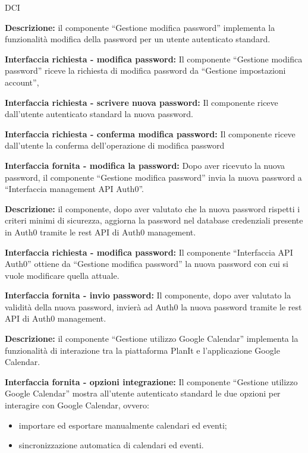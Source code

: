 \begin{listaPersonale}{DCI}

    \textbf{Descrizione:} il componente “Gestione modifica password” implementa la funzionalità modifica della password per un utente autenticato standard.

    \textbf{Interfaccia richiesta - modifica password:} Il componente “Gestione modifica password” riceve la richiesta di modifica password da “Gestione impostazioni account”,

    \textbf{Interfaccia richiesta - scrivere nuova password:} Il componente riceve dall'utente autenticato standard la nuova password.

    \textbf{Interfaccia richiesta - conferma modifica password:} Il componente riceve dall'utente la conferma dell'operazione di modifica password

    \textbf{Interfaccia fornita - modifica la password:} Dopo aver ricevuto la nuova password, il componente “Gestione modifica password” invia la nuova password a “Interfaccia management API Auth0”.



    \textbf{Descrizione:} il componente, dopo aver valutato che la nuova password rispetti i criteri minimi di sicurezza, aggiorna la password nel database credenziali presente in Auth0 tramite le rest API di Auth0 management.

    \textbf{Interfaccia richiesta - modifica password:} Il componente “Interfaccia API Auth0” ottiene da “Gestione modifica password” la nuova password con cui si vuole modificare quella attuale.

    \textbf{Interfaccia fornita - invio password:} Il componente, dopo aver valutato la validità della nuova password, invierà ad Auth0 la nuova password tramite le rest API di Auth0 management.



    \textbf{Descrizione:} il componente “Gestione utilizzo Google Calendar” implementa la funzionalità di interazione tra la piattaforma PlanIt e l'applicazione Google Calendar.

    \textbf{Interfaccia fornita - opzioni integrazione:} Il componente “Gestione utilizzo Google Calendar” mostra all'utente autenticato standard le due opzioni per interagire con Google Calendar, ovvero:
    \begin{itemize}
        \item importare ed esportare manualmente calendari ed eventi;
        \item sincronizzazione automatica di calendari ed eventi.
    \end{itemize}


\end{listaPersonale}

